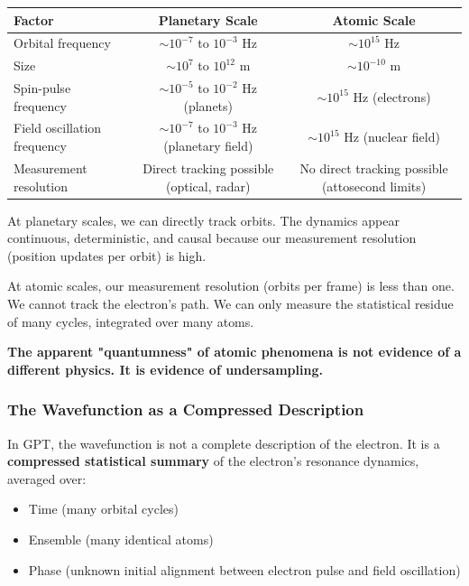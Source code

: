 \documentclass[12pt, a4paper]{article}
\begin{document}
\begin{center}
\small
\begin{tabular}{|l|c|c|}
\hline
\textbf{Factor} & \textbf{Planetary Scale} & \textbf{Atomic Scale} \\
\hline
Orbital frequency & \( \sim 10^{-7} \) to \( 10^{-3} \) Hz & \( \sim 10^{15} \) Hz \\
\hline
Size & \( \sim 10^{7} \) to \( 10^{12} \) m & \( \sim 10^{-10} \) m \\
\hline
Spin-pulse frequency & \( \sim 10^{-5} \) to \( 10^{-2} \) Hz (planets) & \( \sim 10^{15} \) Hz (electrons) \\
\hline
Field oscillation frequency & \( \sim 10^{-7} \) to \( 10^{-3} \) Hz (planetary field) & \( \sim 10^{15} \) Hz (nuclear field) \\
\hline
Measurement resolution & Direct tracking possible (optical, radar) & No direct tracking possible (attosecond limits) \\
\hline
\end{tabular}
\end{center}

At planetary scales, we can directly track orbits. The dynamics appear continuous, deterministic, and causal because our measurement resolution (position updates per orbit) is high.

At atomic scales, our measurement resolution (orbits per frame) is less than one. We cannot track the electron's path. We can only measure the statistical residue of many cycles, integrated over many atoms.

\textbf{The apparent "quantumness" of atomic phenomena is not evidence of a different physics. It is evidence of undersampling.}

\subsubsection{The Wavefunction as a Compressed Description}
\label{subsec:wavefunction_compressed}

In GPT, the wavefunction is not a complete description of the electron. It is a \textbf{compressed statistical summary} of the electron's resonance dynamics, averaged over:

\begin{itemize}
    \item Time (many orbital cycles)
    \item Ensemble (many identical atoms)
    \item Phase (unknown initial alignment between electron pulse and field oscillation)
\end{itemize}
\end{document}
